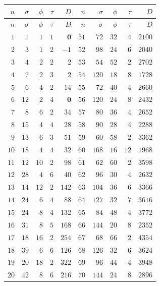 \documentclass[11pt,a4paper]{article}
\theoremstyle{definition}
\begin{document}
\begingroup\small\setlength{\tabcolsep}{4pt}
\begin{longtable}{rrrrr@{\hskip 2em}rrrrr}
\toprule $n$&$\sigma$&$\phi$&$\tau$&$D$&$n$&$\sigma$&$\phi$&$\tau$&$D$\\ \midrule
\endfirsthead \toprule $n$&$\sigma$&$\phi$&$\tau$&$D$&$n$&$\sigma$&$\phi$&$\tau$&$D$\\ \midrule \endhead
$1$ & $1$ & $1$ & $1$ & $\textbf{0}$ & $51$ & $72$ & $32$ & $4$ & $2100$ \\
$2$ & $3$ & $1$ & $2$ & $-1$ & $52$ & $98$ & $24$ & $6$ & $2040$ \\
$3$ & $4$ & $2$ & $2$ & $2$ & $53$ & $54$ & $52$ & $2$ & $2702$ \\
$4$ & $7$ & $2$ & $3$ & $2$ & $54$ & $120$ & $18$ & $8$ & $1728$ \\
$5$ & $6$ & $4$ & $2$ & $14$ & $55$ & $72$ & $40$ & $4$ & $2660$ \\
$6$ & $12$ & $2$ & $4$ & $\textbf{0}$ & $56$ & $120$ & $24$ & $8$ & $2432$ \\
$7$ & $8$ & $6$ & $2$ & $34$ & $57$ & $80$ & $36$ & $4$ & $2652$ \\
$8$ & $15$ & $4$ & $4$ & $28$ & $58$ & $90$ & $28$ & $4$ & $2288$ \\
$9$ & $13$ & $6$ & $3$ & $51$ & $59$ & $60$ & $58$ & $2$ & $3362$ \\
$10$ & $18$ & $4$ & $4$ & $32$ & $60$ & $168$ & $16$ & $12$ & $1968$ \\
$11$ & $12$ & $10$ & $2$ & $98$ & $61$ & $62$ & $60$ & $2$ & $3598$ \\
$12$ & $28$ & $4$ & $6$ & $40$ & $62$ & $96$ & $30$ & $4$ & $2632$ \\
$13$ & $14$ & $12$ & $2$ & $142$ & $63$ & $104$ & $36$ & $6$ & $3366$ \\
$14$ & $24$ & $6$ & $4$ & $88$ & $64$ & $127$ & $32$ & $7$ & $3616$ \\
$15$ & $24$ & $8$ & $4$ & $132$ & $65$ & $84$ & $48$ & $4$ & $3772$ \\
$16$ & $31$ & $8$ & $5$ & $168$ & $66$ & $144$ & $20$ & $8$ & $2352$ \\
$17$ & $18$ & $16$ & $2$ & $254$ & $67$ & $68$ & $66$ & $2$ & $4354$ \\
$18$ & $39$ & $6$ & $6$ & $126$ & $68$ & $126$ & $32$ & $6$ & $3624$ \\
$19$ & $20$ & $18$ & $2$ & $322$ & $69$ & $96$ & $44$ & $4$ & $3948$ \\
$20$ & $42$ & $8$ & $6$ & $216$ & $70$ & $144$ & $24$ & $8$ & $2896$ \\

\end{longtable}
\end{document}
